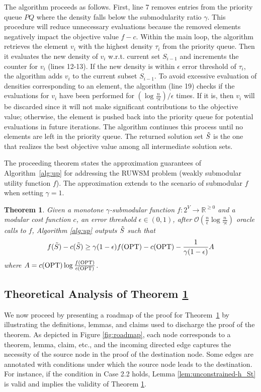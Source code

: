 \documentclass[10pt]{article} %
\newtheorem{theorem}{Theorem}
\theoremstyle{remark}
\newcommand{\OPT}{{\rm OPT}}
\begin{document}
The algorithm proceeds as follows. First, line 7 removes entries from the priority queue $PQ$ where the density falls below the submodularity ratio $\gamma$. This procedure will reduce unnecessary evaluations because the removed elements negatively impact the objective value $f-c$. Within the main loop, the algorithm retrieves the element $v_i$ with the highest density $\tau_i$ from the priority queue. Then it evaluates the new density of $v_i$ w.r.t. current set $S_{i-1}$ and increments the counter for $v_i$ (lines 12-13). If the new density is within $\epsilon$ error threshold of $\tau_i$, the algorithm adds $v_i$ to the current subset $S_{i-1}$. To avoid excessive evaluation of densities corresponding to an element, the algorithm (line 19) checks if the evaluations for $v_i$ have been performed for $(\log \frac{n}{\gamma \epsilon})/\epsilon$ times. If it is, then $v_i$ will be discarded since it will not make significant contributions to the objective value; otherwise, the element is pushed back into the priority queue for potential evaluations in future iterations. The algorithm continues this process until no elements are left in the priority queue. The returned solution set $\Tilde{S}$ is the one that realizes the best objective value among all intermediate solution sets. 

The proceeding theorem states the approximation guarantees of Algorithm~\ref{alg:up} for addressing the RUWSM problem (weakly submodular utility function $f$). The approximation extends to the scenario of submodular $f$ when setting $\gamma=1$.

\begin{theorem}
\label{th:unconstrained}
    Given a monotone $\gamma$-submodular function $f:2^{V} \rightarrow \mathbb{R}^{\geq 0}$ and a modular cost function $c$, an error threshold $\epsilon \in (0,1)$, after $\mathcal{O}(\frac{n}{\epsilon}\log \frac{n}{\gamma \epsilon})$ oracle calls to $f$,  Algorithm \ref{alg:up} outputs $\Tilde{S}$ such that
    \[f(\Tilde{S})-c(\Tilde{S}) \geq \gamma(1-\epsilon)f(\OPT)-c(\OPT)- \frac{1}{\gamma(1-\epsilon)}A\]
    where $A = c(\OPT) \log \frac{f(\OPT)}{c(\OPT)}$.
\end{theorem}


\subsection{Theoretical Analysis of Theorem \ref{th:unconstrained}}
We now proceed by presenting a roadmap of the proof for Theorem~\ref{th:unconstrained} by illustrating the definitions, lemmas, and claims used to discharge the proof of the theorem. As depicted in Figure \ref{fig:roadmap}, each node corresponds to a
theorem, lemma, claim, etc., and the incoming directed edge captures the necessity of the source node in
the proof of the destination node. Some edges are annotated with conditions under which the
source node leads to the destination. For instance, if the condition in Case 2.2
holds, Lemma \ref{lem:unconstrained-h_St} is valid and implies the validity of Theorem \ref{th:unconstrained}.  
\end{document}
